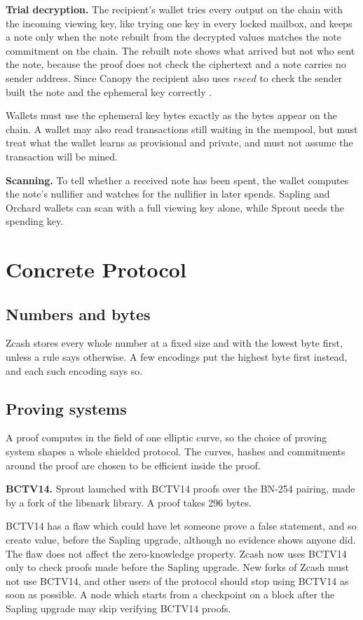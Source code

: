 \documentclass{article}
\let\oldcite\cite
\renewcommand{\cite}[2][]{\raisebox{0ex}{\oldcite[{#1}]{#2}}}
\newcommand{\lsection}[2]{\def\sectionlabel{#2} \section{#1}\label{#2}}
\newcommand{\lsubsection}[2]{\def\sectionlabel{#2} \subsection{#1}\label{#2}}
\newcommand{\intropart}{\needspace{55ex}}
\theoremstyle{labelledtheorem} %
\begin{document}
\textbf{Trial decryption.} The recipient's wallet tries every output on the chain with the incoming viewing key, like trying one key in every locked mailbox, and keeps a note only when the note rebuilt from the decrypted values matches the note commitment on the chain. The rebuilt note shows what arrived but not who sent the note, because the proof does not check the ciphertext and a note carries no sender address. Since Canopy the recipient also uses $\mathit{rseed}$ to check the sender built the note and the ephemeral key correctly \cite{ZIP-212}.

Wallets must use the ephemeral key bytes exactly as the bytes appear on the chain. A wallet may also read transactions still waiting in the mempool, but must treat what the wallet learns as provisional and private, and must not assume the transaction will be mined.

\textbf{Scanning.} To tell whether a received note has been spent, the wallet computes the note's nullifier and watches for the nullifier in later spends. Sapling and Orchard wallets can scan with a full viewing key alone, while Sprout needs the spending key.


\intropart
\vspace{-2ex}
\lsection{Concrete Protocol}{concreteprotocol}

\lsubsection{Numbers and bytes}{readablenumbers}

Zcash stores every whole number at a fixed size and with the lowest byte first, unless a rule says otherwise. A few encodings put the highest byte first instead, and each such encoding says so.

\lsubsection{Proving systems}{readableprovingsystems}
\label{bctv}%

A proof computes in the field of one elliptic curve, so the choice of proving system shapes a whole shielded protocol. The curves, hashes and commitments around the proof are chosen to be efficient inside the proof.

\textbf{BCTV14.} Sprout launched with BCTV14 proofs over the BN-254 pairing, made by a fork of the libsnark library. A proof takes 296 bytes.

BCTV14 has a flaw which could have let someone prove a false statement, and so create value, before the Sapling upgrade, although no evidence shows anyone did. The flaw does not affect the zero-knowledge property. Zcash now uses BCTV14 only to check proofs made before the Sapling upgrade. New forks of Zcash must not use BCTV14, and other users of the protocol should stop using BCTV14 as soon as possible. A node which starts from a checkpoint on a block after the Sapling upgrade may skip verifying BCTV14 proofs.
\end{document}
